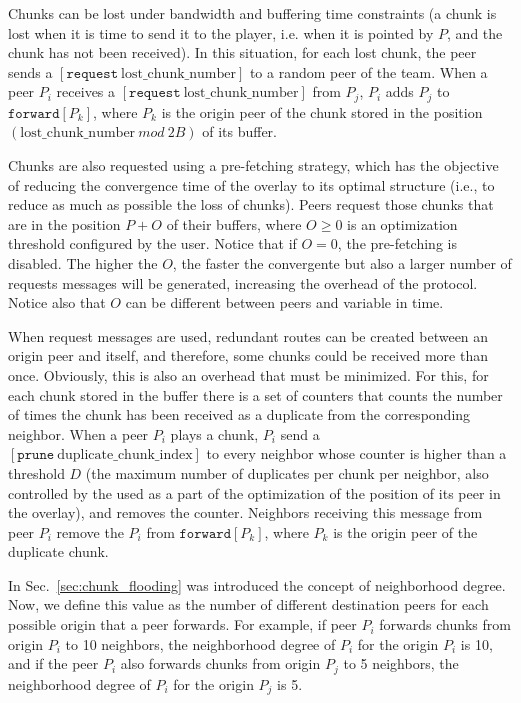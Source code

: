 

\label{sec:routes_discovery}

Chunks can be lost under bandwidth and buffering time constraints (a
chunk is lost when it is time to send it to the player, i.e. when it
is pointed by $P$, and the chunk has not been received). In this
situation, for each lost chunk, the peer sends a
$[\mathtt{request}~\text{lost\_chunk\_number}]$ to a random peer of
the team. When a peer $P_i$ receives a
$[\mathtt{request}~\text{lost\_chunk\_number}]$ from $P_j$, $P_i$ adds
$P_j$ to $\mathtt{forward}[P_k]$, where $P_k$ is the origin peer of
the chunk stored in the position
$(\text{lost\_chunk\_number}~\mathit{mod}~2B)$ of its buffer.

Chunks are also requested using a pre-fetching strategy, which has the
objective of reducing the convergence time of the overlay to its
optimal structure (i.e., to reduce as much as possible the loss of
chunks). Peers request those chunks that are in the position $P+O$ of
their buffers, where $O\geq 0$ is an optimization threshold configured
by the user. Notice that if $O=0$, the pre-fetching is disabled. The
higher the $O$, the faster the convergente but also a larger number of
requests messages will be generated, increasing the overhead of the
protocol. Notice also that $O$ can be different between peers and
variable in time.

When request messages are used, redundant routes can be created
between an origin peer and itself, and therefore, some chunks could be
received more than once. Obviously, this is also an overhead that must
be minimized. For this, for each chunk stored in the buffer there is a
set of counters that counts the number of times the chunk has been
received as a duplicate from the corresponding neighbor. When a peer
$P_i$ plays a chunk, $P_i$ send a
$[\mathtt{prune}~\text{duplicate\_chunk\_index}]$ to every neighbor
whose counter is higher than a threshold $D$ (the maximum number of
duplicates per chunk per neighbor, also controlled by the used as a
part of the optimization of the position of its peer in the overlay),
and removes the counter. Neighbors receiving this message from peer
$P_i$ remove the $P_i$ from $\mathtt{forward}[P_k]$, where $P_k$ is
the origin peer of the duplicate chunk.

In Sec.~\ref{sec:chunk_flooding} was introduced the concept of
neighborhood degree. Now, we define this value as the number of
different destination peers for each possible origin that a peer
forwards. For example, if peer $P_i$ forwards chunks from origin $P_i$
to 10 neighbors, the neighborhood degree of $P_i$ for the origin $P_i$
is 10, and if the peer $P_i$ also forwards chunks from origin $P_j$ to 5
neighbors, the neighborhood degree of $P_i$ for the origin $P_j$ is 5.

